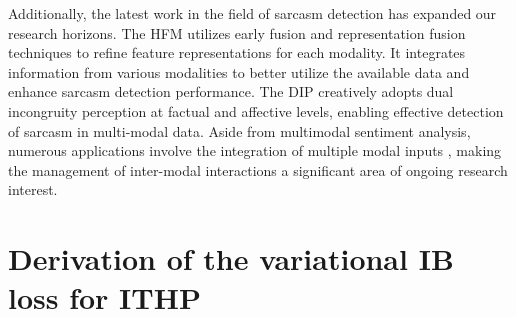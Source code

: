 \documentclass{article} %
\begin{document}
Additionally, the latest work in the field of sarcasm detection has expanded our research horizons. The HFM \citep{cai-etal-2019-multi} utilizes early fusion and representation fusion techniques to refine feature representations for each modality. It integrates information from various modalities to better utilize the available data and enhance sarcasm detection performance. The DIP\citep{wen2023dip} creatively adopts dual incongruity perception at factual and affective levels, enabling effective detection of sarcasm in multi-modal data. Aside from multimodal sentiment analysis, numerous applications involve the integration of multiple modal inputs \citep{recipe2vec,tinyllm,huang2023lvlms, huang2024pixels,xiao2022coupled}, making the management of inter-modal interactions a significant area of ongoing research interest.




\section{Derivation of the variational IB loss for ITHP}
\label{apsec:LossDerivation}
\end{document}
